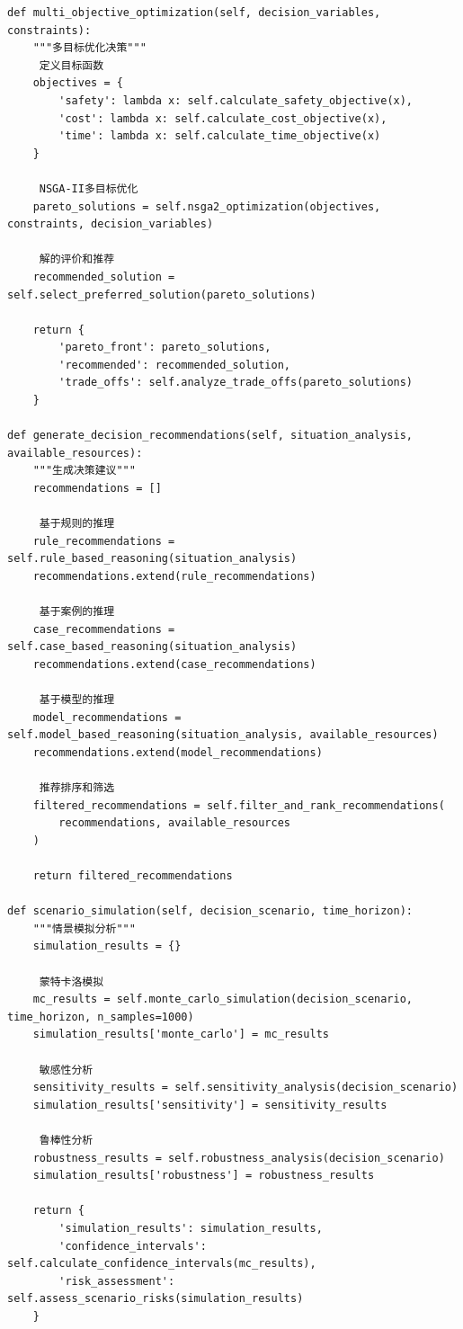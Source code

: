 \begin{verbatim}
def multi_objective_optimization(self, decision_variables, constraints):
    """多目标优化决策"""
     定义目标函数
    objectives = {
        'safety': lambda x: self.calculate_safety_objective(x),
        'cost': lambda x: self.calculate_cost_objective(x),  
        'time': lambda x: self.calculate_time_objective(x)
    }
    
     NSGA-II多目标优化
    pareto_solutions = self.nsga2_optimization(objectives, constraints, decision_variables)
    
     解的评价和推荐
    recommended_solution = self.select_preferred_solution(pareto_solutions)
    
    return {
        'pareto_front': pareto_solutions,
        'recommended': recommended_solution,
        'trade_offs': self.analyze_trade_offs(pareto_solutions)
    }

def generate_decision_recommendations(self, situation_analysis, available_resources):
    """生成决策建议"""
    recommendations = []
    
     基于规则的推理
    rule_recommendations = self.rule_based_reasoning(situation_analysis)
    recommendations.extend(rule_recommendations)
    
     基于案例的推理
    case_recommendations = self.case_based_reasoning(situation_analysis)
    recommendations.extend(case_recommendations)
    
     基于模型的推理  
    model_recommendations = self.model_based_reasoning(situation_analysis, available_resources)
    recommendations.extend(model_recommendations)
    
     推荐排序和筛选
    filtered_recommendations = self.filter_and_rank_recommendations(
        recommendations, available_resources
    )
    
    return filtered_recommendations

def scenario_simulation(self, decision_scenario, time_horizon):
    """情景模拟分析"""
    simulation_results = {}
    
     蒙特卡洛模拟
    mc_results = self.monte_carlo_simulation(decision_scenario, time_horizon, n_samples=1000)
    simulation_results['monte_carlo'] = mc_results
    
     敏感性分析
    sensitivity_results = self.sensitivity_analysis(decision_scenario)
    simulation_results['sensitivity'] = sensitivity_results
    
     鲁棒性分析
    robustness_results = self.robustness_analysis(decision_scenario)
    simulation_results['robustness'] = robustness_results
    
    return {
        'simulation_results': simulation_results,
        'confidence_intervals': self.calculate_confidence_intervals(mc_results),
        'risk_assessment': self.assess_scenario_risks(simulation_results)
    }
\end{verbatim}

